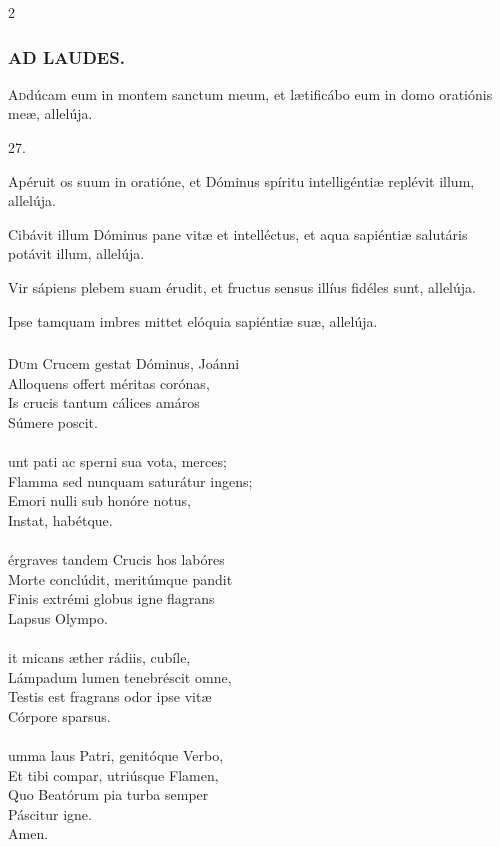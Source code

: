 \documentclass[9pt,twoside]{extarticle}
\begin{document}
\begin{multicols}{2}
\subsubsection*{\center \textsc{AD LAUDES.}}
\begin{center}\end{center}
\lettrine{A}ddúcam eum in montem sanctum meum, et lætificábo eum in domo oratiónis meæ, allelúja.

\begin{tightlist}{}
\item {} 27.
\item {} Apéruit os suum in oratióne, et Dóminus spíritu intelligéntiæ replévit illum, allelúja.
\item {} Cibávit illum Dóminus pane vitæ et intelléctus, et aqua sapiéntiæ salutáris potávit illum, allelúja.
\item {} Vir sápiens plebem suam érudit, et fructus sensus illíus fidéles sunt, allelúja.
\item {} Ipse tamquam imbres mittet elóquia sapiéntiæ suæ, allelúja.
\end{tightlist}

\subsubsection*{\center {}}
\lettrine{D}um Crucem gestat Dóminus, Joánni\\
Alloquens offert méritas corónas,\\
Is crucis tantum cálices amáros\\
Súmere poscit.\\
\\
unt pati ac sperni sua vota, merces;\\
Flamma sed nunquam saturátur ingens;\\
Emori nulli sub honóre notus,\\
Instat, habétque.\\
\\
érgraves tandem Crucis hos labóres\\
Morte conclúdit, meritúmque pandit\\
Finis extrémi globus igne flagrans\\
Lapsus Olympo.\\
\\
it micans æther rádiis, cubíle,\\
Lámpadum lumen tenebréscit omne,\\
Testis est fragrans odor ipse vitæ\\
Córpore sparsus.\\
\\
umma laus Patri, genitóque Verbo,\\
Et tibi compar, utriúsque Flamen,\\
Quo Beatórum pia turba semper\\
Páscitur igne.\\
Amen.


\end{multicols}
\end{document}
